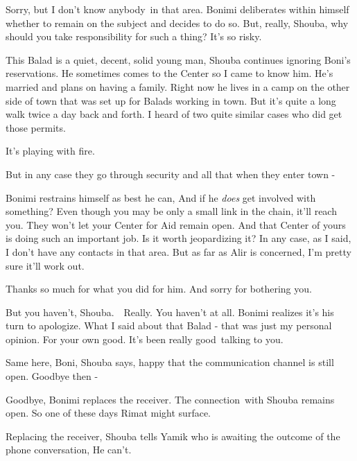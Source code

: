 \documentclass[twoside,11pt]{book}
\begin{document}
{\textquotedbl}Sorry, but I don't know anybody~in that area.{\textquotedbl} Bonimi deliberates within himself whether to
remain on the subject and decides to do so. {\textquotedbl}But, really, Shouba, why should you take responsibility for
such a thing? It's so risky.{\textquotedbl} 

{\textquotedbl}This Balad is a quiet, decent, solid young man,{\textquotedbl} Shouba continues ignoring Boni's
reservations. {\textquotedbl}He sometimes comes to the Center so I came to know him. He's married and plans on having a
family. Right now he lives in a camp on the other side of town that was set up for Balads working in town. But it's
quite a long walk twice a day back and forth. I heard of two quite similar cases who did get those
permits.{\textquotedbl}

{\textquotedbl}It's playing with fire.{\textquotedbl} 

{\textquotedbl}But in any case they go through security and all that when they enter town -{\textquotedbl}

Bonimi restrains himself as best he can, {\textquotedbl}And if he \textit{does} get involved with something? Even though
you may be only a small link in the chain, it'll reach you. They won't let your Center for Aid remain open. And that
Center of yours is doing such an important job. Is it worth jeopardizing it? In any case, as I said, I don't have any
contacts in that area. But as far as Alir is concerned, I'm pretty sure it'll work out.{\textquotedbl} 

{\textquotedbl}Thanks so much for what you did for him. And sorry for bothering you.{\textquotedbl} 

{\textquotedbl}But you haven't, Shouba.\ \ Really. You haven't at all.{\textquotedbl} Bonimi realizes it's his turn to
apologize. {\textquotedbl}What I said about that Balad - that was just my personal opinion. For your own good. It's
been really good{\ }talking to you.{\textquotedbl} 

{\textquotedbl}Same here, Boni,{\textquotedbl} Shouba says, happy that the communication channel is still open.
{\textquotedbl}Goodbye then -{\textquotedbl} 

{\textquotedbl}Goodbye,{\textquotedbl} Bonimi replaces the receiver. The connection~with Shouba remains open. So one of
these days Rimat might surface. 

Replacing the receiver, Shouba tells Yamik who is awaiting the outcome of the phone conversation, {\textquotedbl}He
can't.{\textquotedbl}
\end{document}

